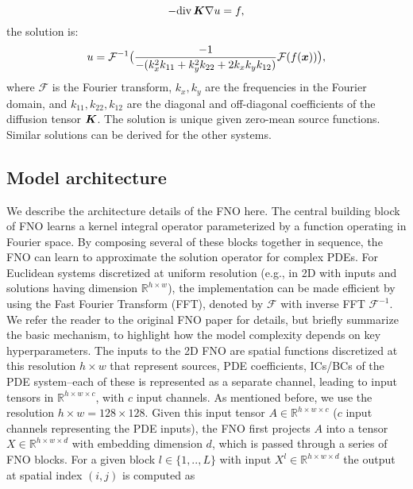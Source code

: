 \begin{equation}
     - \mbox{div}\, \boldsymbol{K} \nabla u = f, \label{eq:poisson_supple}
\end{equation}
the solution is:
\begin{equation}
    u = \mathcal{F}^{-1}\big(\frac{-1}{-(k_x^2k_{11} + k_y^2k_{22} + 2k_xk_yk_{12})} \mathcal{F}(f(\boldsymbol{x})) \big),
\end{equation}
where $\mathcal{F}$ is the Fourier transform, $k_x, k_y$ are the frequencies in the Fourier domain, and $k_{11}, k_{22}, k_{12}$ are the diagonal and off-diagonal coefficients of the diffusion tensor $\boldsymbol{K}$. The solution is unique given zero-mean source functions. Similar solutions can be derived for the other systems.


\subsection{Model architecture}
\label{sec:fno_app}
We describe the architecture details of the FNO here. The central building block of FNO learns a kernel integral operator
parameterized by a function operating in Fourier space. By composing several of
these blocks together in sequence, the FNO can learn to approximate the solution
operator for complex PDEs. For Euclidean systems discretized at uniform
resolution (e.g., in 2D with inputs and solutions having dimension
$\mathbb{R}^{h\times w}$), the implementation can be made efficient by using the
Fast Fourier Transform (FFT), denoted by $\mathcal{F}$ with inverse FFT $\mathcal{F}^{-1}$.
We refer the reader to the original FNO paper \cite{li2020fourier} for details,
but briefly summarize the basic mechanism, to highlight how the model complexity depends on key hyperparameters. 
The inputs to the 2D FNO are spatial functions discretized at this resolution $h \times w$ that represent sources, PDE coefficients, ICs/BCs of the PDE system--each of these is represented as a separate channel,
leading to input tensors in  $\mathbb{R}^{h\times w\times c}$, with $c$ input channels. 
As mentioned before, we use the resolution $h\times w = 128 \times 128$.
Given this input tensor $A \in \mathbb{R}^{h\times w\times c}$ ($c$ input channels representing the PDE inputs), the FNO first projects $A$ into a tensor $X\in\mathbb{R}^{h\times w\times d}$ with embedding dimension $d$, which is passed through a series of FNO blocks. For a given block $l \in \{1, .., L\}$ with input $X^l \in\mathbb{R}^{h\times w\times d}$ the output at spatial index $(i,j)$ is computed as

